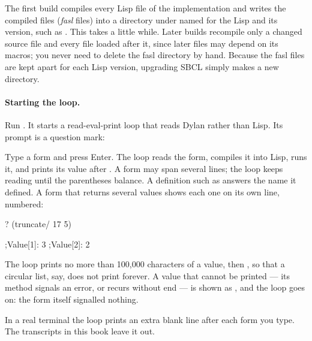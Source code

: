 The first build compiles every Lisp file of the implementation and
writes the compiled files (\emph{fasl} files) into a directory under
 named for the Lisp and its version, such as
. This takes a little while. Later builds
recompile only a changed source file and every file loaded after it,
since later files may depend on its macros; you never need to delete the
fasl directory by hand. Because the fasl files are kept apart for each
Lisp version, upgrading SBCL simply makes a new directory.

\paragraph{Starting the loop.} Run . It starts a
read-eval-print loop that reads Dylan rather than Lisp. Its prompt is a
question mark:


Type a form and press Enter. The loop reads the form, compiles it into
Lisp, runs it, and prints its value after . A form may
span several lines; the loop keeps reading until the parentheses balance.
A definition such as  answers the name it defined. A form
that returns several values shows each one on its own line, numbered:

\begin{repl}
? (truncate/ 17 5)

;Value[1]: 3
;Value[2]: 2
\end{repl}

\noindent The loop prints no more than 100,000 characters of a value, then
, so that a circular list, say, does not print forever. A
value that cannot be printed --- its  method signals
an error, or recurs without end --- is shown as , and the loop goes on: the form itself
signalled nothing.

\begin{notebox}
In a real terminal the loop prints an extra blank line after each form you
type. The transcripts in this book leave it out.
\end{notebox}

